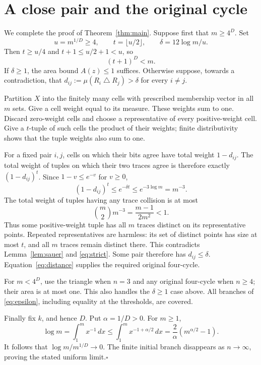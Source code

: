 \documentclass[11pt]{article}
\newcommand{\triangleop}{\mathbin{\triangle}}
\begin{document}
\section{A close pair and the original cycle}

We complete the proof of Theorem~\ref{thm:main}. Suppose first that $m\ge4^D$. Set
\[
u=m^{1/D}\ge4,\qquad t=\lfloor u/2\rfloor,\qquad \delta=12\log m/u.
\]
Then $t\ge u/4$ and $t+1\le u/2+1<u$, so
\begin{equation}\label{eq:strict}
(t+1)^D<m.
\end{equation}
If $\delta\ge1$, the area bound $A(z)\le1$ suffices. Otherwise suppose, towards a contradiction, that $d_{ij}:=\mu(R_i\triangleop R_j)>\delta$ for every $i\ne j$.

Partition $X$ into the finitely many cells with prescribed membership vector in all $m$ sets. Give a cell weight equal to its measure. These weights sum to one. Discard zero-weight cells and choose a representative of every positive-weight cell. Give a $t$-tuple of such cells the product of their weights; finite distributivity shows that the tuple weights also sum to one.

For a fixed pair $i,j$, cells on which their bits agree have total weight $1-d_{ij}$. The total weight of tuples on which their two traces agree is therefore exactly $(1-d_{ij})^t$. Since $1-v\le e^{-v}$ for $v\ge0$,
\[
(1-d_{ij})^t\le e^{-\delta t}\le e^{-3\log m}=m^{-3}.
\]
The total weight of tuples having any trace collision is at most
\[
\binom m2 m^{-3}=\frac{m-1}{2m^2}<1.
\]
Thus some positive-weight tuple has all $m$ traces distinct on its representative points. Repeated representatives are harmless: its set of distinct points has size at most $t$, and all $m$ traces remain distinct there. This contradicts Lemma~\ref{lem:sauer} and \eqref{eq:strict}. Some pair therefore has $d_{ij}\le\delta$. Equation~\eqref{eq:distance} supplies the required original four-cycle.

For $m<4^D$, use the triangle when $n=3$ and any original four-cycle when $n\ge4$; their area is at most one. This also handles the $\delta\ge1$ case above. All branches of \eqref{eq:epsilon}, including equality at the thresholds, are covered.

Finally fix $k$, and hence $D$. Put $\alpha=1/D>0$. For $m\ge1$,
\[
\log m=\int_1^m x^{-1}\,dx
\le\int_1^m x^{-1+\alpha/2}\,dx
=\frac{2}{\alpha}(m^{\alpha/2}-1).
\]
It follows that $\log m/m^{1/D}\to0$. The finite initial branch disappears as $n\to\infty$, proving the stated uniform limit.\hfill$\square$
\end{document}

